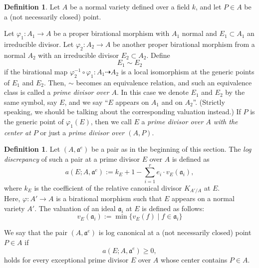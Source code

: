 \documentclass[a4paper]{amsart}
\renewcommand{\a}{{\mathfrak{a}}}
\theoremstyle{definition}
\newtheorem{defn}[thm]{Definition}
\begin{document}
\begin{defn}\label{p.d.} Let $A$ be a normal 
variety defined over  a field $k$, and let $P\in A$ be a (not necessarily closed) point.

Let  \( \varphi_1:A_1 \to A \) be
a proper birational morphism with  $A_1$ normal and $E_1\subset A_1$ 
an irreducible divisor.
 Let  \( \varphi_2:A_2 \to A \) be another
 proper birational morphism from a normal $A_2$ with an irreducible divisor $E_2\subset A_2$.
 Define 
 $$E_1\sim E_2$$
  if  the birational  map
  \(\varphi_2^{-1}\circ \varphi_1 : A_1  \dasharrow  A_2 \) is  a local isomorphism at the 
  generic points of \( E_1 \) and $E_2$.
 Then, $\sim$ becomes an equivalence relation, and
  such an equivalence class  is called a {\sl prime divisor over $A$}. 
    In this case we denote $E_1$ and
   \( E_2 \) by the same symbol, say $E$, and we say ``$E$ appears on $A_1$ and on $A_2$''.
   (Strictly speaking, we should be talking about the
corresponding valuation instead.)
%
 If $P$ is the generic point of  $\varphi_1(E)$, then we call $E$  a {\sl prime divisor over $A$ with the center at $P$}
 or just a {\sl prime divisor over $(A,P)$}.
\end{defn}




     

\begin{defn}\label{defoflogcano}
   Let $(A, \a^e)$ be a pair as in the beginning of this section.
    The {\sl log discrepancy} of such a pair 
    at a prime divisor $E$ over $A$ is 
    defined as 
$$a(E; A,\a^e):=k_E+1-\sum_{i=1}^r e_i\cdot  v_E(\a_i),$$
      where $k_E$ is the coefficient of the relative canonical divisor 
      $K_{{A}'/A}$ at $E$.\\
Here, $\varphi:{A'}\to A$ is a birational morphism such that $E$ appears on 
  a normal variety 
   ${A'}$. 
   The valuation of an ideal $\a_i$ at $E$ is defined as follows:
   $$ v_E(\a_i):=\min\{ v_E(f) \mid f\in \a_i\}$$
   
   

   We say that the pair $(A, \a^e)$ is log canonical  at a (not necessarily closed)
     point  $P\in A$ if
\begin{equation}\label{discrepancy}
a(E;A,\a^e)\geq 0,
\end{equation}
holds for every exceptional prime divisor $E$ over $A$ whose center contains $P\in A$.
\end{defn}
\end{document}
